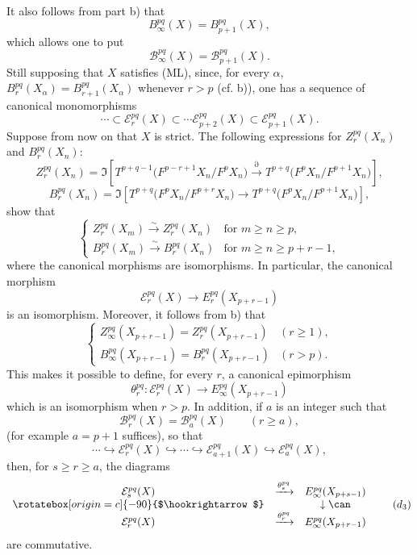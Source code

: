 It also follows from part b) that
\[
B_\infty^{pq}(X)=B_{p+1}^{pq}(X),
\]
which allows one to put
\[
\mathcal B_\infty^{pq}(X)=\mathcal B_{p+1}^{pq}(X).
\]
Still supposing that \(X\) satisfies (ML), since, for every \(\alpha\),
\(B_r^{pq}(X_\alpha)=B_{r+1}^{pq}(X_\alpha)\) whenever \(r>p\) (cf. b)),
one has a sequence of canonical monomorphisms
\begin{equation}
\cdots\subset\mathcal E_r^{pq}(X)\subset\cdots\mathcal E_{p+2}^{pq}(X)\subset\mathcal E_{p+1}^{pq}(X).
\tag{S}
\end{equation}
Suppose from now on that \(X\) is strict. The following expressions for \(Z_r^{pq}(X_n)\) and \(B_r^{pq}(X_n)\):
\[
Z_r^{pq}(X_n)=
\Im\!\left[
T^{p+q-1}\bigl(F^{p-r+1}X_n/F^pX_n\bigr)
\xrightarrow{\partial}
T^{p+q}\bigl(F^pX_n/F^{p+1}X_n\bigr)
\right],
\]
\[
B_r^{pq}(X_n)=
\Im\!\left[
T^{p+q}\bigl(F^pX_n/F^{p+r}X_n\bigr)
\longrightarrow
T^{p+q}\bigl(F^pX_n/F^{p+1}X_n\bigr)
\right],
\]
show that
\begin{equation}
\left\{
\begin{array}{ll}
Z_r^{pq}(X_m)\xrightarrow{\sim}Z_r^{pq}(X_n)&\text{for }m\ge n\ge p,\\[3pt]
B_r^{pq}(X_m)\xrightarrow{\sim}B_r^{pq}(X_n)&\text{for }m\ge n\ge p+r-1,
\end{array}
\right.
\tag{\(d_1\)}
\end{equation}
where the canonical morphisms are isomorphisms. In particular, the canonical morphism
\[
\mathcal E_r^{pq}(X)\longrightarrow E_r^{pq}(X_{p+r-1})
\]
is an isomorphism. Moreover, it follows from b) that
\begin{equation}
\left\{
\begin{array}{ll}
Z_\infty^{pq}(X_{p+r-1})=Z_r^{pq}(X_{p+r-1})&(r\ge1),\\[3pt]
B_\infty^{pq}(X_{p+r-1})=B_r^{pq}(X_{p+r-1})&(r>p).
\end{array}
\right.
\tag{\(d_2\)}
\end{equation}
This makes it possible to define, for every \(r\), a canonical epimorphism
\[
\theta_r^{pq}:\mathcal E_r^{pq}(X)\longrightarrow E_\infty^{pq}(X_{p+r-1})
\]
which is an isomorphism when \(r>p\). In addition, if \(a\) is an integer such that
\[
\mathcal B_r^{pq}(X)=\mathcal B_a^{pq}(X)\qquad(r\ge a),
\]
(for example \(a=p+1\) suffices), so that
\begin{equation}
\cdots\hookrightarrow\mathcal E_r^{pq}(X)\hookrightarrow\cdots\hookrightarrow
\mathcal E_{a+1}^{pq}(X)\hookrightarrow\mathcal E_a^{pq}(X),
\tag{S bis}
\end{equation}
then, for \(s\ge r\ge a\), the diagrams
\begin{equation}
\begin{array}{ccc}
\mathcal E_s^{pq}(X)&\xrightarrow{\theta_s^{pq}}&E_\infty^{pq}(X_{p+s-1})\\
\rotatebox[origin=c]{-90}{$\hookrightarrow$}&&\downarrow\can\\
\mathcal E_r^{pq}(X)&\xrightarrow{\theta_r^{pq}}&E_\infty^{pq}(X_{p+r-1})
\end{array}
\tag{\(d_3\)}
\end{equation}
are commutative.

